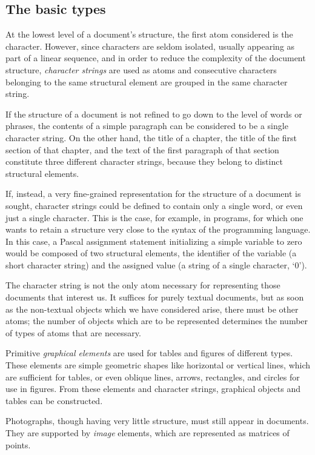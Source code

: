 \subsection{The basic types}

At the lowest level of a document's structure, the first atom
considered is the character.  However, since characters are seldom isolated,
usually appearing as part of a linear sequence, and in order to reduce
the complexity of the document structure, {\em character strings} are
used as atoms and consecutive characters belonging to the same
structural element are grouped in the same character string.

If the structure of a document is not refined to go down to  the level
of words or phrases, the contents of a simple paragraph can be
considered to be a single character string.  On the other hand, the
title of a chapter, the title of the first section of that chapter,
and the text of the first paragraph of that section constitute three
different character strings, because they belong to distinct
structural elements.

If, instead, a very fine-grained representation for the structure of a
document is sought, character strings could be defined to contain only
a single word, or even just a single character.  This is the case, for
example, in programs,  for which one wants to retain a structure very
close to the syntax of the programming language.  In this case, a
Pascal assignment statement initializing a simple variable to zero
would be composed of two structural elements, the identifier of the
variable (a short character string) and the assigned value (a string
of a single character, `0').

The character string is not the only atom necessary for representing
those documents that interest us.  It suffices for purely textual
documents, but as soon as the non-textual objects which we have
considered arise, there must be other atoms; the number of objects
which are to be represented determines the number of types of atoms
that are necessary.

Primitive {\em graphical elements} are used for tables and figures of
different types.  These elements are simple geometric shapes like
horizontal or vertical lines, which are sufficient for tables, or even
oblique lines, arrows, rectangles, and circles for use in figures.
From these elements and character strings, graphical objects and
tables can be constructed.

Photographs, though having very little structure, must still appear in
documents.  They are supported by {\em image} elements, which are
represented as matrices of points.

